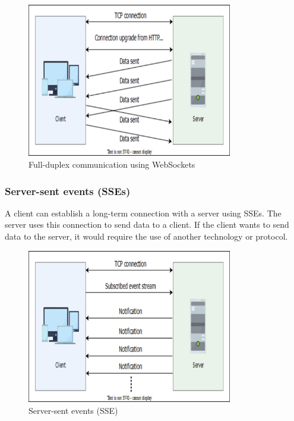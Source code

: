 \begin{figure}[htbp]
 \centering
 \includegraphics[width=0.8\textwidth]{Images/chapter_1/section_4705505809661952/6099513748357120.png}
 \caption{Full-duplex communication using WebSockets}
\end{figure}

\subsubsection{Server-sent events (SSEs)}\label{clSmpjY3b6-ZaeLvydfLG}

A client can establish a long-term connection with a server using SSEs. The server uses this connection to send data to a client. If the client wants to send data to the server, it would require the use of another technology or protocol.

\begin{figure}[htbp]
 \centering
 \includegraphics[width=0.8\textwidth]{Images/chapter_1/section_4705505809661952/5728562590384128.png}
 \caption{Server-sent events (SSE)}
\end{figure}

